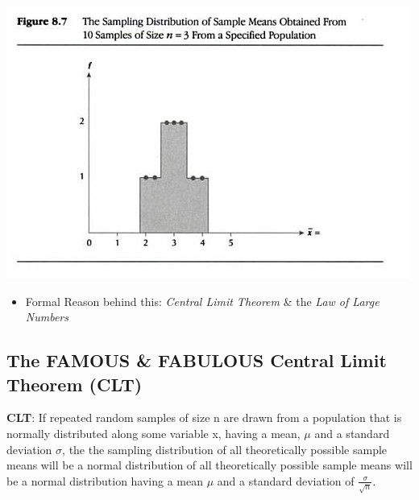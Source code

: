 \documentclass[]{article}
\begin{document}
\includegraphics{x_bar1.png}

\begin{itemize}
\itemsep1pt\parskip0pt
\item
  Formal Reason behind this: \emph{Central Limit Theorem} \& the
  \emph{Law of Large Numbers}
\end{itemize}

\subsection{The FAMOUS \& FABULOUS Central Limit Theorem
(CLT)}\label{the-famous-fabulous-central-limit-theorem-clt}

\textbf{CLT}: If repeated random samples of size n are drawn from a
population that is normally distributed along some variable x, having a
mean, $\mu$ and a standard deviation $\sigma$, the the sampling
distribution of all theoretically possible sample means will be a normal
distribution of all theoretically possible sample means will be a normal
distribution having a mean $\mu$ and a standard deviation of
$\frac{\sigma}{\sqrt{n}}$.
\end{document}

